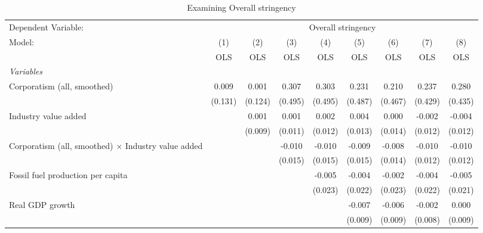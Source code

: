 
\begin{table}[htbp]
   \caption{Examining Overall stringency}
   \centering
   \begin{tabular}{lcccccccc}
      \toprule
      Dependent Variable: & \multicolumn{8}{c}{Overall stringency}\\
      Model:                                                     & (1)     & (2)     & (3)     & (4)     & (5)     & (6)     & (7)     & (8)\\  
                                                                 &  OLS    & OLS     & OLS     & OLS     & OLS     & OLS     & OLS     & OLS\\  
      \midrule
      \emph{Variables}\\
      Corporatism (all, smoothed)                                & 0.009   & 0.001   & 0.307   & 0.303   & 0.231   & 0.210   & 0.237   & 0.280\\   
                                                                 & (0.131) & (0.124) & (0.495) & (0.495) & (0.487) & (0.467) & (0.429) & (0.435)\\   
      Industry value added                                       &         & 0.001   & 0.001   & 0.002   & 0.004   & 0.000   & -0.002  & -0.004\\   
                                                                 &         & (0.009) & (0.011) & (0.012) & (0.013) & (0.014) & (0.012) & (0.012)\\   
      Corporatism (all, smoothed) $\times$ Industry value added  &         &         & -0.010  & -0.010  & -0.009  & -0.008  & -0.010  & -0.010\\   
                                                                 &         &         & (0.015) & (0.015) & (0.015) & (0.014) & (0.012) & (0.012)\\   
      Fossil fuel production per capita                          &         &         &         & -0.005  & -0.004  & -0.002  & -0.004  & -0.005\\   
                                                                 &         &         &         & (0.023) & (0.022) & (0.023) & (0.022) & (0.021)\\   
      Real GDP growth                                            &         &         &         &         & -0.007  & -0.006  & -0.002  & 0.000\\   
                                                                 &         &         &         &         & (0.009) & (0.009) & (0.008) & (0.009)\\   

\end{tabular}
\end{table}
